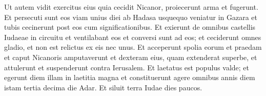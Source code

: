 \begin{biblechapter}
\verse Ut autem vidit exercitus eius quia cecidit Nicanor, proiecerunt arma et fugerunt. 
\verse Et persecuti sunt eos viam unius diei ab Hadasa usquequo veniatur in Gazara et tubis cecinerunt post eos cum significationibus. 
\verse Et exierunt de omnibus castellis Iudaeae in circuitu et ventilabant eos et conversi sunt ad eos; et ceciderunt omnes gladio, et non est relictus ex eis nec unus. 
\verse Et acceperunt spolia eorum et praedam et caput Nicanoris amputaverunt et dexteram eius, quam extenderat superbe, et attulerunt et suspenderunt contra Ierusalem.  
\verse Et laetatus est populus valde; et egerunt diem illam in laetitia magna 
\verse et constituerunt agere omnibus annis diem istam tertia decima die Adar. 
\verse Et siluit terra Iudae dies paucos. 
\end{biblechapter}

